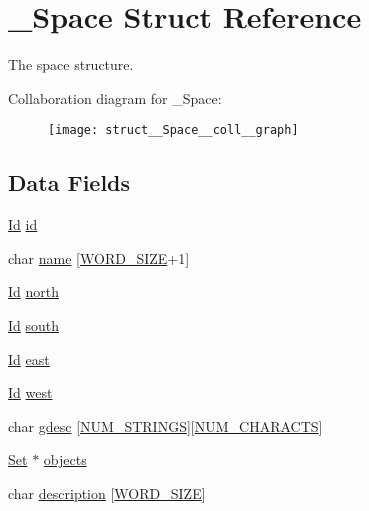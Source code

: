 \hypertarget{struct__Space}{}\section{\+\_\+\+Space Struct Reference}
\label{struct__Space}


The space structure.  




Collaboration diagram for \+\_\+\+Space\+:\nopagebreak
\begin{figure}[H]
\begin{center}
\leavevmode
\texttt{[image: struct\_\_Space\_\_coll\_\_graph]}
\end{center}
\end{figure}
\subsection*{Data Fields}
\begin{DoxyCompactItemize}
\item 
\hyperlink{types_8h_a845e604fb28f7e3d97549da3448149d3}{Id} \hyperlink{struct__Space_a70cb461deb9ac073e401b607339b567f}{id}
\item 
char \hyperlink{struct__Space_aa1c9c994c2d16ecf3ef46138685fdfdc}{name} \mbox{[}\hyperlink{types_8h_a92ed8507d1cd2331ad09275c5c4c1c89}{W\+O\+R\+D\+\_\+\+S\+I\+ZE}+1\mbox{]}
\item 
\hyperlink{types_8h_a845e604fb28f7e3d97549da3448149d3}{Id} \hyperlink{struct__Space_ae5ebe53ce79514d7d2d93911e0159252}{north}
\item 
\hyperlink{types_8h_a845e604fb28f7e3d97549da3448149d3}{Id} \hyperlink{struct__Space_a646b68c22a0bbf1685033c96109d31d1}{south}
\item 
\hyperlink{types_8h_a845e604fb28f7e3d97549da3448149d3}{Id} \hyperlink{struct__Space_a41ce2bf33cf0c157b358221f094ee05b}{east}
\item 
\hyperlink{types_8h_a845e604fb28f7e3d97549da3448149d3}{Id} \hyperlink{struct__Space_a20c1d259e93b44e24ba82982e142eb9b}{west}
\item 
char \hyperlink{struct__Space_a0c4d07c615267b6d8744885709ad403d}{gdesc} \mbox{[}\hyperlink{space_8h_a9c6419e7f541d4daf14f5ccd56e03f17}{N\+U\+M\+\_\+\+S\+T\+R\+I\+N\+GS}\mbox{]}\mbox{[}\hyperlink{space_8h_a4f7414c5a72de21b6b45d462410dfc97}{N\+U\+M\+\_\+\+C\+H\+A\+R\+A\+C\+TS}\mbox{]}
\item 
\hyperlink{set_8h_a6d3b7f7c92cbb4577ef3ef7ddbf93161}{Set} $\ast$ \hyperlink{struct__Space_a661ed8b0fc8085b6db70188aa5085625}{objects}
\item 
char \hyperlink{struct__Space_a2a50aacb78d1d0f65f5b14f94ed81d80}{description} \mbox{[}\hyperlink{types_8h_a92ed8507d1cd2331ad09275c5c4c1c89}{W\+O\+R\+D\+\_\+\+S\+I\+ZE}\mbox{]}
\end{DoxyCompactItemize}


